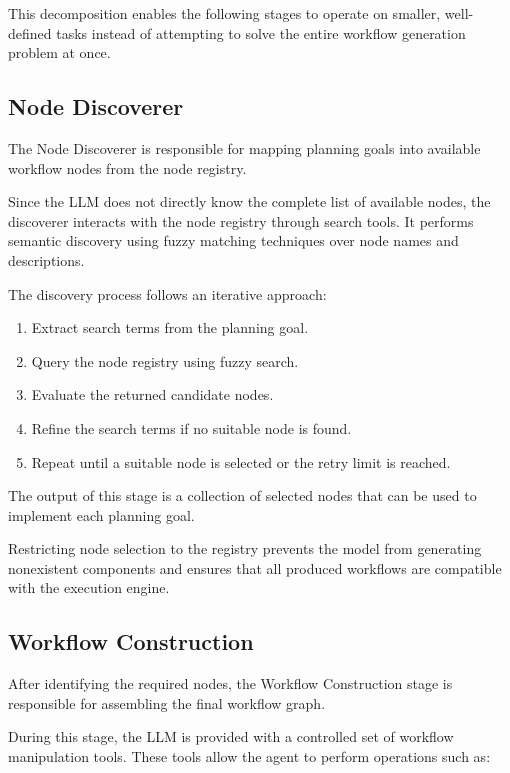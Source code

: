 This decomposition enables the following stages to operate on smaller, well-defined tasks instead of attempting to solve the entire workflow generation problem at once.

\subsection{Node Discoverer}

The Node Discoverer is responsible for mapping planning goals into available workflow nodes from the node registry.

Since the LLM does not directly know the complete list of available nodes, the discoverer interacts with the node registry through search tools. It performs semantic discovery using fuzzy matching techniques over node names and descriptions.

The discovery process follows an iterative approach:

\begin{enumerate}
    \item Extract search terms from the planning goal.
    \item Query the node registry using fuzzy search.
    \item Evaluate the returned candidate nodes.
    \item Refine the search terms if no suitable node is found.
    \item Repeat until a suitable node is selected or the retry limit is reached.
\end{enumerate}

The output of this stage is a collection of selected nodes that can be used to implement each planning goal.

Restricting node selection to the registry prevents the model from generating nonexistent components and ensures that all produced workflows are compatible with the execution engine.

\subsection{Workflow Construction}

After identifying the required nodes, the Workflow Construction stage is responsible for assembling the final workflow graph.

During this stage, the LLM is provided with a controlled set of workflow manipulation tools. These tools allow the agent to perform operations such as:

